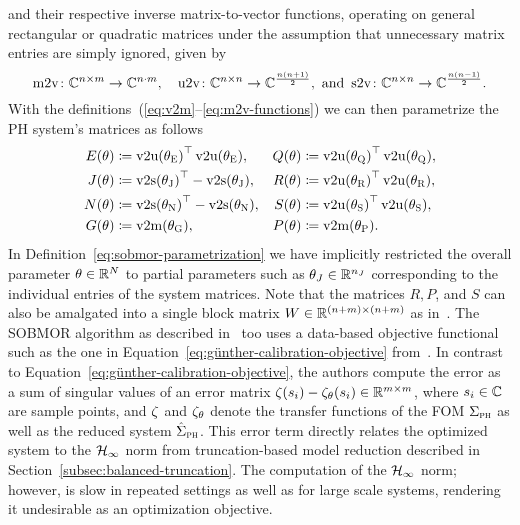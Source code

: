 and their respective inverse matrix-to-vector functions, operating on general rectangular or quadratic matrices under the assumption that unnecessary matrix entries are simply ignored, given by
\begin{equation}\label{eq:m2v-functions}
    \mathop{}\!\mathrm{m}2\mathrm{v} \colon \mathbb{C}^{n \times m} \to \mathbb{C}^{n \cdot m},\quad \mathop{}\!\mathrm{u}2\mathrm{v} \colon \mathbb{C}^{n \times n} \to \mathbb{C}^{\frac{n (n + 1)}{2}}, \text{ and } \mathop{}\!\mathrm{s}2\mathrm{v} \colon \mathbb{C}^{n \times n} \to \mathbb{C}^{\frac{n (n - 1)}{2}}.
\end{equation}
With the definitions~(\ref{eq:v2m}--\ref{eq:m2v-functions}) we can then parametrize the \ac{PH} system's matrices as follows
\begin{equation}\label{eq:sobmor-parametrization}
    \begin{alignedat}{3}
        E(\theta) &\coloneqq {\vecupper(\theta_\msc{E})}\trans \vecupper(\theta_\msc{E}),\quad &Q(\theta) &\coloneqq {\vecupper(\theta_\msc{Q})}\trans \vecupper(\theta_\msc{Q}), \\
        J(\theta) &\coloneqq {\vecstrict(\theta_\msc{J})}\trans - \vecstrict(\theta_\msc{J}),\quad &R(\theta) &\coloneqq {\vecupper(\theta_\msc{R})}\trans \vecupper(\theta_\msc{R}), \\
        N(\theta) &\coloneqq {\vecstrict(\theta_\msc{N})}\trans - \vecstrict(\theta_\msc{N}),\quad &S(\theta) &\coloneqq {\vecupper(\theta_\msc{S})}\trans \vecupper(\theta_\msc{S}), \\
        G(\theta) &\coloneqq \vecmat(\theta_\msc{G}),\quad &P(\theta) &\coloneqq \vecmat(\theta_\msc{P}).
    \end{alignedat}
\end{equation}
In Definition~\eqref{eq:sobmor-parametrization} we have implicitly restricted the overall parameter $\theta \in \mathbb{R}^N$ to partial parameters such as $\theta_J \in \mathbb{R}^{n_J}$ corresponding to the individual entries of the system matrices.
Note that the matrices $R, P$, and $S$ can also be amalgated into a single block matrix $W \in \mathbb{R}^{(n + m) \times (n + m)}$ as in~\cite{Schwerdtner2021}.
The \ac{SOBMOR} algorithm as described in~\cite{SV2023} too uses a data-based objective functional such as the one in Equation~\eqref{eq:günther-calibration-objective} from~\cite{Günther2023}.
In contrast to Equation~\eqref{eq:günther-calibration-objective}, the authors compute the error as a sum of singular values of an error matrix $\zeta(s_i) - \zeta_\theta(s_i) \in \mathbb{R}^{m \times m}$, where $s_i \in \mathbb{C}$ are sample points, and $\zeta$ and $\zeta_\theta$ denote the transfer functions of the \ac{FOM} $\Sigma_{\textnormal{\scshape ph}}$ as well as the reduced system $\hat{\Sigma}_{\textnormal{\scshape ph}}$.
This error term directly relates the optimized system to the $\mathcal{H}_\infty$ norm from truncation-based model reduction described in Section~\ref{subsec:balanced-truncation}.
The computation of the $\mathcal{H}_\infty$ norm; however, is slow in repeated settings as well as for large scale systems, rendering it undesirable as an optimization objective.

